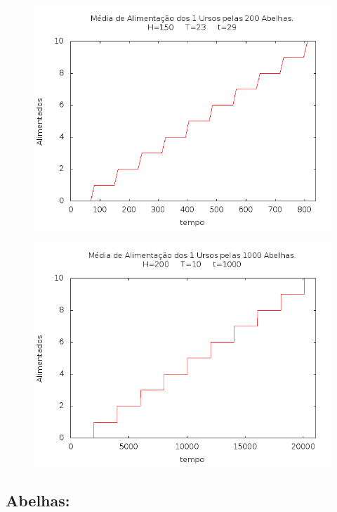 \documentclass[12pt,a4paper]{article}
\begin{document}
\begin{figure}[!htb]
\centering
\includegraphics[width=0.7\paperwidth]{./graficos/ursos_200_1_150_29_23.png}
\label{Rotulo}
\end{figure}

\begin{figure}[!htb]
\centering
\includegraphics[width=0.7\paperwidth]{./graficos/ursos_1000_1_200_1000_10.png}
\label{Rotulo}
\end{figure}

\clearpage
\subsection{Abelhas:}
\end{document}
